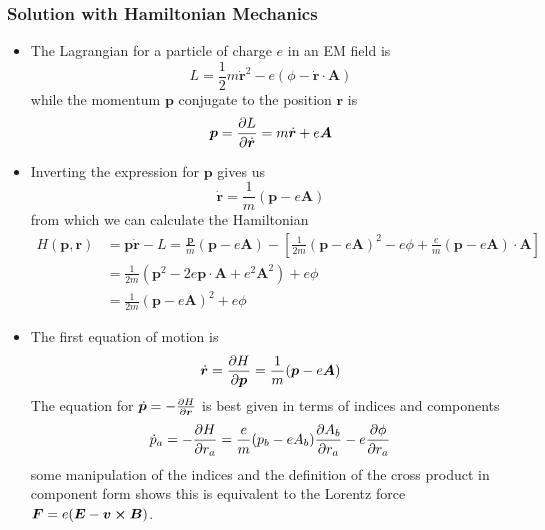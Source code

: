 \documentclass[11pt, a4paper]{article}
\newcommand{\bdot}[1]{\dot{\bm{#1}}}
\begin{document}
\subsubsection{Solution with Hamiltonian Mechanics}
\begin{itemize}
	\item The Lagrangian for a particle of charge $ e $ in an EM field is
	\begin{equation*}
		L = \frac{1}{2}m \bdot{r}^{2} - e(\phi - \bdot{r}\cdot \bm{A})
	\end{equation*}
	while the momentum $ \bm{p} $ conjugate to the position $ \bm{r} $ is
	\begin{equation*}
		\bm{p} = \pdv{L}{\bdot{r}} = m \bdot{r} + e\bm{A}
	\end{equation*}
	
	\item Inverting the expression for $ \bm{p} $ gives us
	\begin{equation*}
		\bdot{r} = \frac{1}{m}(\bm{p}-e\bm{A})
	\end{equation*}
	from which we can calculate the Hamiltonian
	\begin{align*}
		H(\bm{p}, \bm{r}) &= \bm{p} \bdot{r} - L = \frac{\bm{p} }{m}(\bm{p} - e\bm{A}) - \left[\frac{1}{2m} (\bm{p} - e\bm{A})^{2} - e \phi + \frac{e}{m}(\bm{p} - e\bm{A})\cdot \bm{A} \right]\\
		&=\frac{1}{2m}(\bm{p}^{2} - 2e \bm{p}\cdot \bm{A} + e^{2}\bm{A}^{2}) + e \phi\\
		&=\frac{1}{2m}(\bm{p} - e \bm{A})^{2} + e \phi
	\end{align*}
	
	\item The first equation of motion is
	\begin{equation*}
		\bdot{r} = \pdv{H}{\bm{p}} = \frac{1}{m}(\bm{p} - e \bm{A})
	\end{equation*}
	The equation for $ \bdot{p} = - \pdv{H}{\bm{r}} $ is best given in terms of indices and components
	\begin{equation*}
		\dot{p}_{a} = - \pdv{H}{r_{a}} = \frac{e}{m}(p_{b} - eA_{b}) \pdv{A_{b}}{r_{a}} - e \pdv{\phi}{r_{a}}
	\end{equation*}
	some manipulation of the indices and the definition of the cross product in component form shows this is equivalent to the Lorentz force $ \bm{F} = e(\bm{E} - \bm{v} \cross \bm{B}) $.
\end{itemize}
\end{document}
